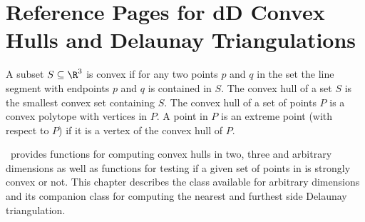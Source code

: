 
\clearpage
\section{Reference Pages for dD Convex Hulls and Delaunay Triangulations}

A subset $S \subseteq \R^3$ is convex if for any two points $p$ and $q$
in the set the line segment with endpoints $p$ and $q$ is contained
in $S$. The convex hull of a set $S$ is 
the smallest convex set containing
$S$. The convex hull of a set of points $P$ is a convex 
polytope with vertices in $P$.  A point in $P$ is an extreme point 
(with respect to $P$) if it is a vertex 
of the convex hull of $P$.

\cgal\ provides functions for computing convex hulls in two, three 
and arbitrary dimensions as well as functions for testing if a given set of 
points in is strongly convex or not.  This chapter describes the class
available for arbitrary dimensions and its companion class for 
computing the nearest and furthest side Delaunay triangulation. 



 \\
 \\
 \\


 \\
  \\

\clearpage

